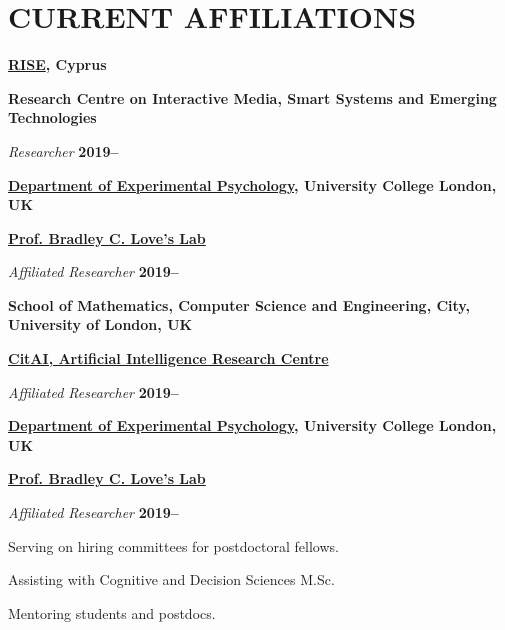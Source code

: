 \section{CURRENT AFFILIATIONS}


  \textbf{\href{https://rise.org.cy}{RISE}, Cyprus}
  \begin{outerlist}
  \item[\textbf{Research Centre on Interactive Media, Smart Systems and Emerging Technologies}]
  \item[\textit{Researcher}] \hfill \textbf{2019--}
  \end{outerlist}
  \vspace{15pt}
  
  \textbf{\href{https://www.ucl.ac.uk/pals/research/experimental-psychology/}{Department of Experimental Psychology}, University College London, UK}
\begin{outerlist}
  \item[\textbf{\href{https://bradlove.org/}{Prof. Bradley C. Love's Lab}}] 
  \item[\textit{Affiliated Researcher}] \hfill \textbf{2019--}

  \end{outerlist}
  \vspace{15pt}
  
  
  \textbf{School of Mathematics, Computer Science and Engineering, City, \newline University of London, UK}
  \begin{outerlist}
  \item[\textbf{\href{https://cit-ai.net}{CitAI, Artificial Intelligence Research Centre}}]
  \item[\textit{Affiliated Researcher}] \hfill \textbf{2019--}
  \end{outerlist}

  
\textbf{\href{https://www.ucl.ac.uk/pals/research/experimental-psychology/}{Department of Experimental Psychology}, University College London, UK}
\begin{outerlist}
  \item[\textbf{\href{https://bradlove.org/}{Prof. Bradley C. Love's Lab}}] 
  \item[\textit{Affiliated Researcher}] \hfill \textbf{2019--}
    \begin{innerlist}
    \item  Serving on hiring committees for postdoctoral fellows.
    \item  Assisting with Cognitive and Decision Sciences M.Sc.
    \item  Mentoring students and postdocs.

  \end{innerlist}
  \end{outerlist}
  \vspace{15pt}
  
